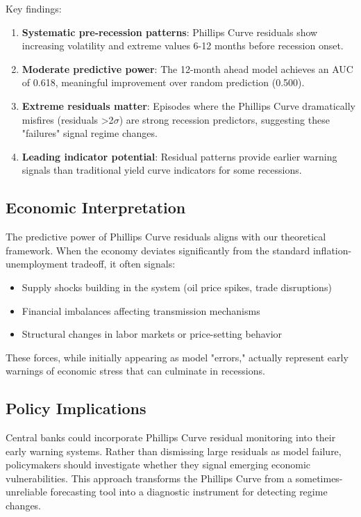 \documentclass[12pt]{article}
\begin{document}
Key findings:

\begin{enumerate}
    \item \textbf{Systematic pre-recession patterns}: Phillips Curve residuals show increasing volatility and extreme values 6-12 months before recession onset.
    
    \item \textbf{Moderate predictive power}: The 12-month ahead model achieves an AUC of 0.618, meaningful improvement over random prediction (0.500).
    
    \item \textbf{Extreme residuals matter}: Episodes where the Phillips Curve dramatically misfires (residuals >2$\sigma$) are strong recession predictors, suggesting these "failures" signal regime changes.
    
    \item \textbf{Leading indicator potential}: Residual patterns provide earlier warning signals than traditional yield curve indicators for some recessions.
\end{enumerate}

\subsection{Economic Interpretation}

The predictive power of Phillips Curve residuals aligns with our theoretical framework. When the economy deviates significantly from the standard inflation-unemployment tradeoff, it often signals:

\begin{itemize}
    \item Supply shocks building in the system (oil price spikes, trade disruptions)
    \item Financial imbalances affecting transmission mechanisms
    \item Structural changes in labor markets or price-setting behavior
\end{itemize}

These forces, while initially appearing as model "errors," actually represent early warnings of economic stress that can culminate in recessions.

\subsection{Policy Implications}

Central banks could incorporate Phillips Curve residual monitoring into their early warning systems. Rather than dismissing large residuals as model failure, policymakers should investigate whether they signal emerging economic vulnerabilities. This approach transforms the Phillips Curve from a sometimes-unreliable forecasting tool into a diagnostic instrument for detecting regime changes.
\end{document}

